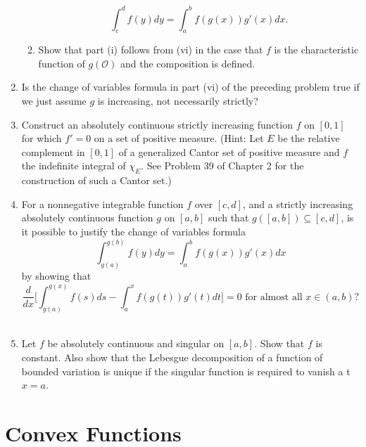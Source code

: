 \begin{enumerate}
\begin{enumerate}[label=(\roman*),align=left]
        \[
            \int_c^df(y)dy=\int_a^bf(g(x))g'(x)dx.
        \]
        \item Show that part (i) follows from (vi) in the case that $f$ is the characteristic function of $g(\mathcal{O})$ and the composition is defined.
    \end{enumerate}
    \item Is the change of variables formula in part (vi) of the preceding problem true if we just assume $g$ is increasing, not necessarily strictly?
    \item Construct an absolutely continuous strictly increasing function $f$ on $[0,1]$ for which $f'=0$ on a set of positive measure.
    (Hint: Let $E$ be the relative complement in $[0,1]$ of a generalized Cantor set of positive measure and $f$ the indefinite integral of $\chi_E$. See Problem 39 of Chapter 2 for the construction of such a Cantor set.)
    \item For a nonnegative integrable function $f$ over $[c,d]$, and a strictly increasing absolutely continuous function $g$ on $[a,b]$ such that $g([a,b])\subseteq [c,d]$, is it possible to justify the change of variables formula
    \[
        \int_{g(a)}^{g(b)}f(y)dy=\int_a^bf(g(x))g'(x)dx  
    \]
    by showing that
    \[
        \frac{d}{dx}\biggl[\int_{g(a)}^{g(x)}f(s)ds-\int_a^xf(g(t))g'(t)dt\biggr]=0\text{ for almost all }x\in(a,b)?  
    \]\
    \item Let $f$ be absolutely continuous and singular on $[a,b]$. Show that $f$ is constant. Also show that the Lebesgue decomposition of a function of bounded variation is unique if the singular function is required to vanish a t $x=a$.
\end{enumerate}

\section{Convex Functions}

